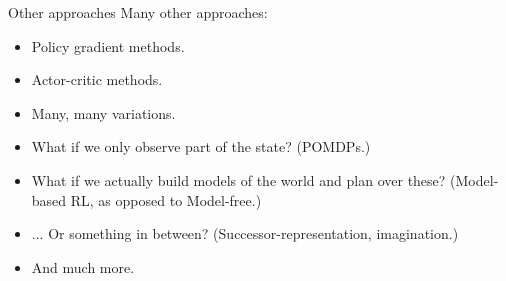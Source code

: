 \documentclass{beamer}
\begin{document}
\begin{frame}{Other approaches}
Many other approaches:
\begin{itemize}
    \item<1-> Policy gradient methods.
    \item<2-> Actor-critic methods.
    \item<3-> Many, many variations.
\end{itemize}
\begin{itemize}
    \item<5-> What if we only observe part of the state? (POMDPs.) 
    \item<6-> What if we actually build models of the world and plan over these? (Model-based RL, as opposed to Model-free.) 
    \item<7-> ... Or something in between? (Successor-representation, imagination.)
    \item<8-> And much more.
\end{itemize}
\end{frame}
\end{document}

